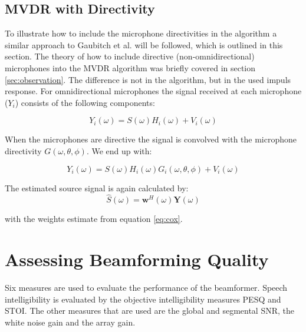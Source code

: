 \subsection{MVDR with Directivity}
\label{sec:des_mvdr_dir}
To illustrate how to include the microphone directivities in the algorithm a similar approach to Gaubitch et al. \cite{gaubitch2014} will be followed, which is outlined in this section. The theory of how to include directive (non-omnidirectional) microphones into the MVDR algorithm was briefly covered in section \ref{sec:observation}. The difference is not in the algorithm, but in the used impuls response. \newline
For omnidirectional microphones the signal received at each microphone ($Y_{i}$) consists of the following components:

\begin{equation}
Y_{i}(\omega) = S(\omega)H_{i}(\omega) + V_{i}(\omega)
\end{equation}

When the microphones are directive the signal is convolved with the microphone directivity $G(\omega, \theta, \phi)$. We end up with:

\begin{equation}
Y_{i}(\omega) = S(\omega)H_{i}(\omega)G_{i}(\omega, \theta, \phi) + V_{i}(\omega)
\end{equation}

The estimated source signal is again calculated by:
\begin{equation}
\hat{S}(\omega) = \textbf{w}^{H}(\omega)\textbf{Y}(\omega)
\end{equation}

with the weights estimate from equation \ref{eq:cox}.

\section{Assessing Beamforming Quality}
\label{sec:des_evaluation}
Six measures are used to evaluate the performance of the beamformer. Speech intelligibility is evaluated by the objective intelligibility measures PESQ and STOI. The other measures that are used are the global and segmental SNR, the white noise gain and the array gain.

